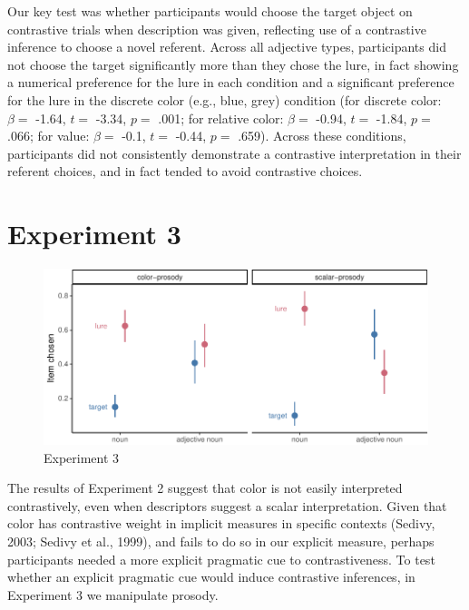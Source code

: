 \documentclass[10pt, letterpaper]{article}
\newenvironment{CodeChunk}{}{}
\begin{document}
Our key test was whether participants would choose the target object on
contrastive trials when description was given, reflecting use of a
contrastive inference to choose a novel referent. Across all adjective
types, participants did not choose the target significantly more than
they chose the lure, in fact showing a numerical preference for the lure
in each condition and a significant preference for the lure in the
discrete color (e.g., blue, grey) condition (for discrete color:
\(\beta =\) -1.64, \(t =\) -3.34, \(p =\) .001; for relative color:
\(\beta =\) -0.94, \(t =\) -1.84, \(p =\) .066; for value: \(\beta =\)
-0.1, \(t =\) -0.44, \(p =\) .659). Across these conditions,
participants did not consistently demonstrate a contrastive
interpretation in their referent choices, and in fact tended to avoid
contrastive choices.

\section{Experiment 3}\label{experiment-3}

\begin{CodeChunk}
\begin{figure}[tb]

{\centering \includegraphics{figs/e3_fig-1} 

}

\caption[Experiment 3]{Experiment 3}\label{fig:e3_fig}
\end{figure}
\end{CodeChunk}

The results of Experiment 2 suggest that color is not easily interpreted
contrastively, even when descriptors suggest a scalar interpretation.
Given that color has contrastive weight in implicit measures in specific
contexts (Sedivy, 2003; Sedivy et al., 1999), and fails to do so in our
explicit measure, perhaps participants needed a more explicit pragmatic
cue to contrastiveness. To test whether an explicit pragmatic cue would
induce contrastive inferences, in Experiment 3 we manipulate prosody.
\end{document}
